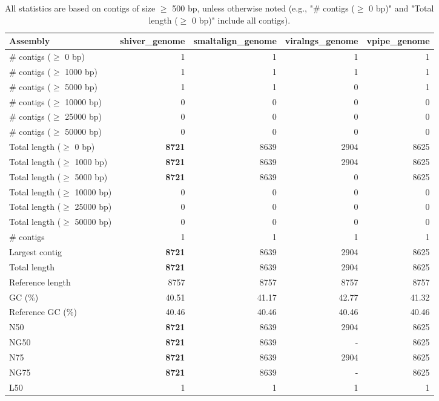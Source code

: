 \documentclass[12pt,a4paper]{article}
\begin{document}
\begin{table}[ht]
\begin{center}
\caption{All statistics are based on contigs of size $\geq$ 500 bp, unless otherwise noted (e.g., "\# contigs ($\geq$ 0 bp)" and "Total length ($\geq$ 0 bp)" include all contigs).}
\begin{tabular}{|l*{4}{|r}|}
\hline
Assembly & shiver\_genome & smaltalign\_genome & viralngs\_genome & vpipe\_genome \\ \hline
\# contigs ($\geq$ 0 bp) & 1 & 1 & 1 & 1 \\ \hline
\# contigs ($\geq$ 1000 bp) & 1 & 1 & 1 & 1 \\ \hline
\# contigs ($\geq$ 5000 bp) & 1 & 1 & 0 & 1 \\ \hline
\# contigs ($\geq$ 10000 bp) & 0 & 0 & 0 & 0 \\ \hline
\# contigs ($\geq$ 25000 bp) & 0 & 0 & 0 & 0 \\ \hline
\# contigs ($\geq$ 50000 bp) & 0 & 0 & 0 & 0 \\ \hline
Total length ($\geq$ 0 bp) & {\bf 8721} & 8639 & 2904 & 8625 \\ \hline
Total length ($\geq$ 1000 bp) & {\bf 8721} & 8639 & 2904 & 8625 \\ \hline
Total length ($\geq$ 5000 bp) & {\bf 8721} & 8639 & 0 & 8625 \\ \hline
Total length ($\geq$ 10000 bp) & 0 & 0 & 0 & 0 \\ \hline
Total length ($\geq$ 25000 bp) & 0 & 0 & 0 & 0 \\ \hline
Total length ($\geq$ 50000 bp) & 0 & 0 & 0 & 0 \\ \hline
\# contigs & 1 & 1 & 1 & 1 \\ \hline
Largest contig & {\bf 8721} & 8639 & 2904 & 8625 \\ \hline
Total length & {\bf 8721} & 8639 & 2904 & 8625 \\ \hline
Reference length & 8757 & 8757 & 8757 & 8757 \\ \hline
GC (\%) & 40.51 & 41.17 & 42.77 & 41.32 \\ \hline
Reference GC (\%) & 40.46 & 40.46 & 40.46 & 40.46 \\ \hline
N50 & {\bf 8721} & 8639 & 2904 & 8625 \\ \hline
NG50 & {\bf 8721} & 8639 & - & 8625 \\ \hline
N75 & {\bf 8721} & 8639 & 2904 & 8625 \\ \hline
NG75 & {\bf 8721} & 8639 & - & 8625 \\ \hline
L50 & 1 & 1 & 1 & 1 \\ \hline

\end{tabular}
\end{center}
\end{table}
\end{document}
